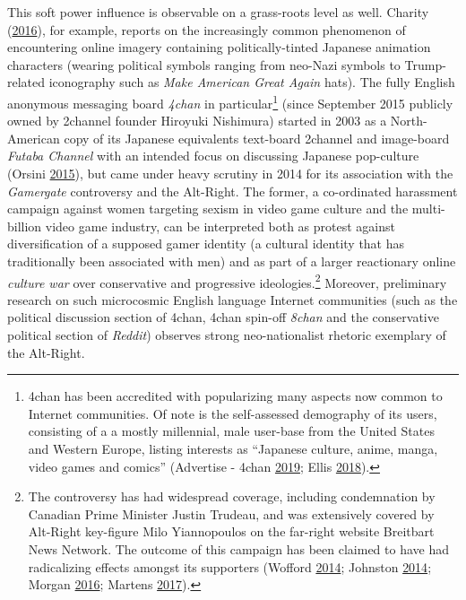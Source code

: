 \documentclass[10pt,british,A4paper,,openany]{memoir}
\begin{document}
This soft power influence is observable on a grass-roots level as well.
Charity (\protect\hyperlink{ref-charity_why_2016}{2016}), for example,
reports on the increasingly common phenomenon of encountering online
imagery containing politically-tinted Japanese animation characters
(wearing political symbols ranging from neo-Nazi symbols to
Trump-related iconography such as \emph{Make American Great Again}
hats). The fully English anonymous messaging board \emph{4chan} in
particular\footnote{4chan has been accredited with popularizing many
  aspects now common to Internet communities. Of note is the
  self-assessed demography of its users, consisting of a a mostly
  millennial, male user-base from the United States and Western Europe,
  listing interests as ``Japanese culture, anime, manga, video games and
  comics'' (Advertise - 4chan
  \protect\hyperlink{ref-noauthor_advertise_nodate}{2019}; Ellis
  \protect\hyperlink{ref-ellis_4chan_2018}{2018}).} (since September
2015 publicly owned by 2channel founder Hiroyuki Nishimura) started in
2003 as a North-American copy of its Japanese equivalents text-board
2channel and image-board \emph{Futaba Channel} with an intended focus on
discussing Japanese pop-culture (Orsini
\protect\hyperlink{ref-orsini_how_2015}{2015}), but came under heavy
scrutiny in 2014 for its association with the \emph{Gamergate}
controversy and the Alt-Right. The former, a co-ordinated harassment
campaign against women targeting sexism in video game culture and the
multi-billion video game industry, can be interpreted both as protest
against diversification of a supposed gamer identity (a cultural
identity that has traditionally been associated with men) and as part of
a larger reactionary online \emph{culture war} over conservative and
progressive ideologies.\footnote{The controversy has had widespread
  coverage, including condemnation by Canadian Prime Minister Justin
  Trudeau, and was extensively covered by Alt-Right key-figure Milo
  Yiannopoulos on the far-right website Breitbart News Network. The
  outcome of this campaign has been claimed to have had radicalizing
  effects amongst its supporters (Wofford
  \protect\hyperlink{ref-wofford_is_2014}{2014}; Johnston
  \protect\hyperlink{ref-johnston_chat_2014}{2014}; Morgan
  \protect\hyperlink{ref-morgan_analysis_2016}{2016}; Martens
  \protect\hyperlink{ref-martens_rally_2017}{2017}).} Moreover,
preliminary research on such microcosmic English language Internet
communities (such as the political discussion section of 4chan, 4chan
spin-off \emph{8chan} and the conservative political section of
\emph{Reddit}) observes strong neo-nationalist rhetoric exemplary of the
Alt-Right.
\end{document}
